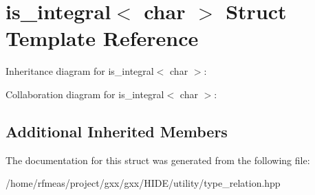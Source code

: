 \hypertarget{structis__integral_3_01char_01_4}{}\section{is\+\_\+integral$<$ char $>$ Struct Template Reference}
\label{structis__integral_3_01char_01_4}


Inheritance diagram for is\+\_\+integral$<$ char $>$\+:


Collaboration diagram for is\+\_\+integral$<$ char $>$\+:
\subsection*{Additional Inherited Members}


The documentation for this struct was generated from the following file\+:\begin{DoxyCompactItemize}
\item 
/home/rfmeas/project/gxx/gxx/\+H\+I\+D\+E/utility/type\+\_\+relation.\+hpp\end{DoxyCompactItemize}
